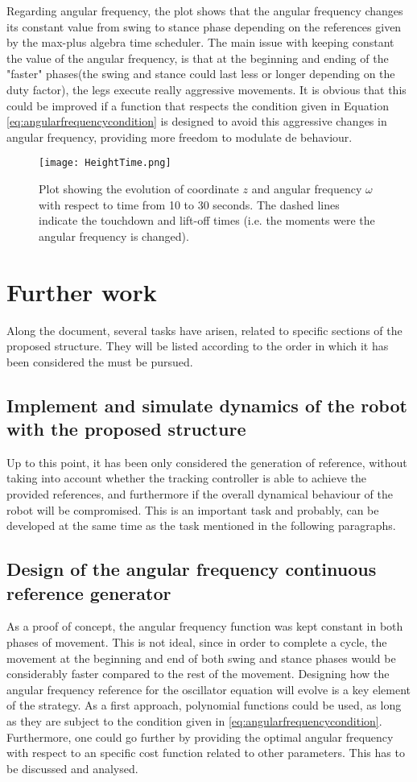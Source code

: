 \documentclass[main.tex]{subfiles}
\begin{document}
Regarding angular frequency, the plot shows that the angular frequency changes its constant value from swing to stance phase depending on the references given by the max-plus algebra time scheduler. The main issue with keeping constant the value of the angular frequency, is that at the beginning and ending of the "faster" phases(the swing and stance could last less or longer depending on the duty factor), the legs execute really aggressive movements. It is obvious that this could be improved if a function that respects the condition given in Equation \ref{eq:angularfrequencycondition} is designed to avoid this aggressive changes in angular frequency, providing more freedom to modulate de behaviour.
\begin{figure}[H]\centering
		\texttt{[image: HeightTime.png]}
		\caption{Plot showing the evolution of coordinate $z$ and angular frequency $\omega$ with respect to time from 10 to 30 seconds. The dashed lines indicate the touchdown and lift-off times (i.e. the moments were the angular frequency is changed).
			\label{fig:HeightTime} }
\end{figure}

\section{Further work}
Along the document, several tasks have arisen, related to specific sections of the proposed structure. They will be listed according to the order in which it has been considered the must be pursued.
\subsection{Implement and simulate dynamics of the robot with the proposed structure}
Up to this point, it has been only considered the generation of reference, without taking into account whether the tracking controller is able to achieve the provided references, and furthermore if the overall dynamical behaviour of the robot will be compromised. This is an important task and probably, can be developed at the same time as the task mentioned in the following paragraphs.
\subsection{Design of the angular frequency continuous reference generator}
As a proof of concept, the angular frequency function was kept constant in both phases of movement. This is not ideal, since in order to complete a cycle, the movement at the beginning and end of both swing and stance phases would be considerably faster compared to the rest of the movement. Designing how the angular frequency reference for the oscillator equation will evolve is a key element of the strategy. As a first approach, polynomial functions could be used, as long as they are subject to the condition given in \eqref{eq:angularfrequencycondition}. Furthermore, one could go further by providing the optimal angular frequency with respect to an specific cost function related to other parameters. This has to be discussed and analysed.
\end{document}
